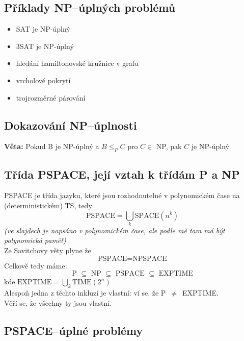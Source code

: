\documentclass[10pt,a4paper]{article}
\theoremstyle{note}
\begin{document}
	\subsection{Příklady NP--úplných problémů}
		\begin{itemize}
			\item SAT je NP-úplný
			\item 3SAT je NP-úplný
			\item  hledání  hamiltonovské kružnice v grafu
			\item vrcholové pokrytí
			\item trojrozměrné párování
		\end{itemize}

	\subsection{Dokazování NP--úplnosti}

		\textbf{Věta:} Pokud B je NP-úplný a $B \leq_P C$ pro $C \in $ NP, pak $C$ je NP-úplný

	\subsection{Třída PSPACE, její vztah k třídám P a NP}

		PSPACE je třída jazyku, které jsou rozhodnutelné v polynomickém čase na (deterministickém) TS, tedy
		$$\text{PSPACE} = \bigcup_k \text{SPACE}(n^k)$$
		\textit{(ve slajdech je napsáno v polynomickém čase, ale podle mě tam má být polynomická paměť)}\\
		Ze Savitchovy věty plyne že $$\text{PSPACE} = \text{NPSPACE}$$
		Celkově tedy máme:
		$$\text{ P } \subseteq \text{ NP } \subseteq \text{ PSPACE } \subseteq \text{ EXPTIME } $$  kde
		$\text{EXPTIME} = \bigcup_k \text{TIME}(2^n)$\\
		Alespoň jedna z těchto inkluzí je vlastní: ví se, že P~$\neq$~EXPTIME.\\
		Věří se, že všechny ty jsou vlastní.


	\subsection{PSPACE--úplné problémy}
\end{document}
